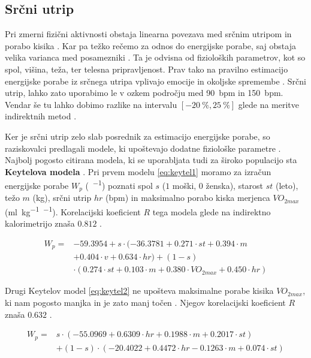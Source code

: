 \subsection{Srčni utrip}
Pri zmerni fizični aktivnosti obstaja linearna povezava med srčnim utripom in porabo kisika \cite{keytel2005prediction}. Kar pa težko rečemo za odnos do energijske porabe, saj obstaja velika varianca med posamezniki \cite{levine2005measurement}. Ta je odvisna od fizioloških parametrov, kot so spol, višina, teža, ter telesna pripravljenost. Prav tako na pravilno estimacijo energijske porabe iz srčnega utripa vplivajo emocije in okoljske spremembe \cite{keytel2005prediction}. Srčni utrip, lahko zato uporabimo le v ozkem področju med \SI{90}{bpm} in \SI{150}{bpm}. Vendar še tu lahko dobimo razlike na intervalu $[-20~\% , 25~\%]$ glede na meritve indirektnih metod \cite{keytel2005prediction}. 

Ker je srčni utrip zelo slab posrednik za estimacijo energijske porabe, so raziskovalci predlagali modele, ki upoštevajo dodatne fiziološke parametre \cite{charlot2014improvement}. Najbolj pogosto citirana modela, ki se uporabljata tudi za široko populacijo sta \textbf{Keytelova modela} \cite{keytel2005prediction}. Pri prvem modelu \eqref{eq:keytel1} moramo za izračun energijske porabe $W_p$ (\si{\kcal.\min^{-1}}) poznati spol $s$ ($1$ moški, $0$ ženska), starost $st$ (leto), težo $m$ (\si{\kg}), srčni utrip $hr$ (\si{bpm}) in maksimalno porabo kiska merjenca $VO_{2max}$ (\si{\ml.\kg^{-1}.\min^{-1}}). Korelacijski koeficient $R$ tega modela glede na indirektno kalorimetrijo znaša $0.812$ \cite{charlot2014improvement}.

\begin{align} \label{eq:keytel1}
W_p = & -59.3954 + s \cdot (-36.3781 + 0.271 \cdot st + 0.394 \cdot m  \nonumber \\
& + 0.404 \cdot v + 0.634 \cdot hr ) + (1 - s) \nonumber \\
& \cdot (0.274 \cdot st + 0.103 \cdot m + 0.380 \cdot VO_{2max} + 0.450 \cdot hr)
\end{align}

Drugi Keytelov model \eqref{eq:keytel2} ne upošteva maksimalne porabe kisika $VO_{2max}$, ki nam pogosto manjka in je zato manj točen \cite{keytel2005prediction}. Njegov korelacijski koeficient $R$ znaša $0.632$ \cite{charlot2014improvement}.

\begin{align}\label{eq:keytel2}
 W_p = & s \cdot (-55.0969 + 0.6309 \cdot hr + 0.1988 \cdot m + 0.2017 \cdot st) \nonumber \\
 & + (1 - s) \cdot (-20.4022 + 0.4472 \cdot hr - 0.1263 \cdot m + 0.074 \cdot st)
\end{align}


